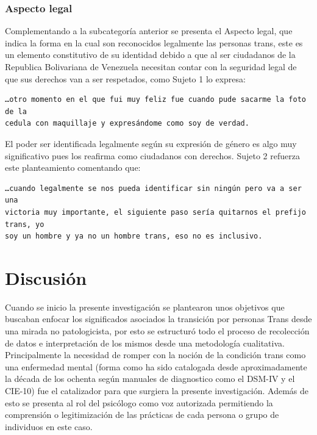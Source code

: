 \subsubsection{Aspecto legal}

Complementando a la subcategoría anterior se presenta el Aspecto legal, que
indica la forma en la cual son reconocidos legalmente las personas trans, este
es un elemento constitutivo de su identidad debido a que al ser ciudadanos de la
Republica Bolivariana de Venezuela necesitan contar con la seguridad legal de
que sus derechos van a ser respetados, como Sujeto 1 lo expresa:

\begin{verbatim}
…otro momento en el que fui muy feliz fue cuando pude sacarme la foto de la
cedula con maquillaje y expresándome como soy de verdad.
\end{verbatim}

El poder ser identificada legalmente según su expresión de género es algo muy
significativo pues los reafirma como ciudadanos con derechos. Sujeto 2 refuerza
este planteamiento comentando que:

\begin{verbatim}
…cuando legalmente se nos pueda identificar sin ningún pero va a ser una
victoria muy importante, el siguiente paso sería quitarnos el prefijo trans, yo
soy un hombre y ya no un hombre trans, eso no es inclusivo.
\end{verbatim}

\section{Discusión}\label{sec:discusion}

Cuando se inicio la presente investigación se plantearon unos objetivos que
buscaban enfocar los significados asociados la transición por personas Trans
desde una mirada no patologicista, por esto se estructuró todo el proceso de
recolección de datos e interpretación de los mismos desde una metodología
cualitativa. Principalmente la necesidad de romper con la noción de la condición
trans como una enfermedad mental (forma como ha sido catalogada desde
aproximadamente la década de los ochenta según manuales de diagnostico como el
DSM-IV y el CIE-10) fue el catalizador para que surgiera la presente
investigación. Además de esto se presenta al rol del psicólogo como voz
autorizada permitiendo la comprensión o legitimización de las prácticas de cada
persona o grupo de individuos en este caso.

